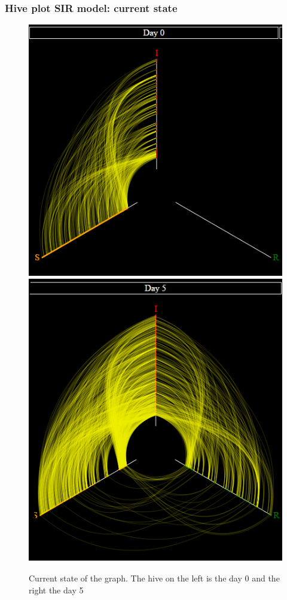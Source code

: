 \documentclass{beamer}
\begin{document}
\begin{frame}
\frametitle{Hive plot SIR model: current state}
\begin{figure}[H]\label{fig:perc_diff}
\centering	
\includegraphics[scale=0.45]{img/hive1.PNG}
\vspace{20pt}
\includegraphics[scale=0.405]{img/dataset1.PNG}
\caption{Current state of the graph. The hive on the left is the day 0 and the right the day 5}
\end{figure}
\end{frame}
\end{document}

